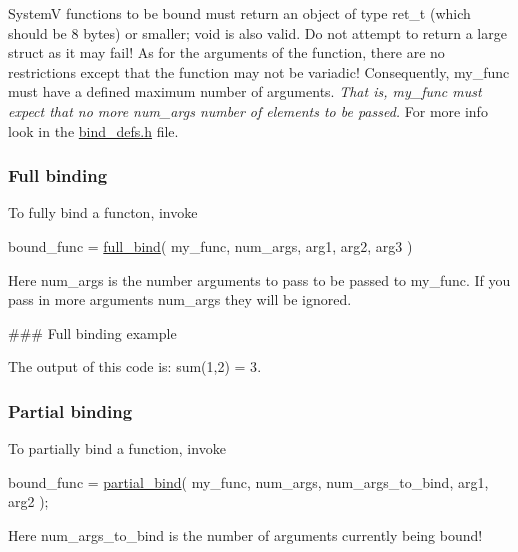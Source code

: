 SystemV functions to be bound must return an object of type {\ttfamily ret\+\_\+t} (which should be 8 bytes) or smaller; {\ttfamily void} is also valid. Do not attempt to return a large struct as it may fail! As for the arguments of the function, there are no restrictions except that the function may not be variadic! Consequently, {\ttfamily my\+\_\+func} must have a defined maximum number of \textquotesingle{}arguments\textquotesingle{}. {\itshape That is, {\ttfamily my\+\_\+func} must expect that no more {\ttfamily num\+\_\+args} number of elements to be passed.} For more info look in the {\ttfamily \hyperlink{bind__defs_8h}{bind\+\_\+defs.\+h}} file.

\subsubsection*{Full binding}

To fully bind a functon, invoke 
\begin{DoxyCode}
bound\_func = \hyperlink{bind_8c_a31fdc3dfcbd70d3f32f4e3c8a2084c6a}{full\_bind}( my\_func, num\_args, arg1, arg2, arg3 )
\end{DoxyCode}
 Here {\ttfamily num\+\_\+args} is the number arguments to pass to be passed to {\ttfamily my\+\_\+func}. If you pass in more arguments {\ttfamily num\+\_\+args} they will be ignored.

\#\#\# Full binding example 
 The output of this code is\+: {\ttfamily sum(1,2) = 3}.

\subsubsection*{Partial binding}

To partially bind a function, invoke 
\begin{DoxyCode}
bound\_func = \hyperlink{bind_8c_a187e674be73b611c4e8d97345192757a}{partial\_bind}( my\_func, num\_args, num\_args\_to\_bind, arg1, arg2 );
\end{DoxyCode}
 Here {\ttfamily num\+\_\+args\+\_\+to\+\_\+bind} is the number of arguments currently being bound!

